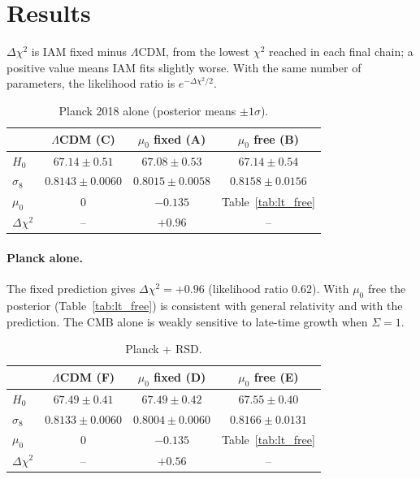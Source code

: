 \section{Results}
$\Delta\chi^2$ is IAM fixed minus $\Lambda$CDM, from the lowest $\chi^2$ reached in each final chain; a positive value means IAM fits slightly worse. With the same
number of parameters, the likelihood ratio is $e^{-\Delta\chi^2/2}$.

\begin{table}[h]\centering\small
\caption{Planck 2018 alone (posterior means $\pm1\sigma$).}\label{tab:lt_planck}
\begin{tabular}{lccc}\hline
& $\Lambda$CDM (C) & $\mu_0$ fixed (A) & $\mu_0$ free (B)\\\hline
$H_0$ & $67.14\pm0.51$ & $67.08\pm0.53$ & $67.14\pm0.54$\\
$\sigma_8$ & $0.8143\pm0.0060$ & $0.8015\pm0.0058$ & $0.8158\pm0.0156$\\
$\mu_0$ & 0 & $-0.135$ & Table~\ref{tab:lt_free}\\
$\Delta\chi^2$ & -- & $+0.96$ & --\\\hline
\end{tabular}\end{table}
\paragraph{Planck alone.} The fixed prediction gives $\Delta\chi^2=+0.96$ (likelihood ratio $0.62$). With $\mu_0$ free the posterior (Table~\ref{tab:lt_free}) is consistent
with general relativity and with the prediction. The CMB alone is weakly sensitive to late-time growth when $\Sigma=1$.

\begin{table}[h]\centering\small
\caption{Planck + RSD.}\label{tab:lt_rsd}
\begin{tabular}{lccc}\hline
& $\Lambda$CDM (F) & $\mu_0$ fixed (D) & $\mu_0$ free (E)\\\hline
$H_0$ & $67.49\pm0.41$ & $67.49\pm0.42$ & $67.55\pm0.40$\\
$\sigma_8$ & $0.8133\pm0.0060$ & $0.8004\pm0.0060$ & $0.8166\pm0.0131$\\
$\mu_0$ & 0 & $-0.135$ & Table~\ref{tab:lt_free}\\
$\Delta\chi^2$ & -- & $+0.56$ & --\\\hline
\end{tabular}\end{table}
